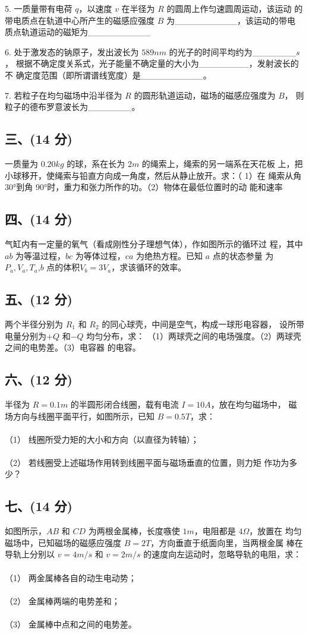 5. 一质量带有电荷 $q$，以速度 $v$ 在半径为 $R$ 的圆周上作匀速圆周运动，该运动
的带电质点在轨道中心所产生的磁感应强度 $B$ 为__________，该运动的带电
质点轨道运动的磁矩为__________

6. 处于激发态的钠原子，发出波长为 $589nm$ 的光子的时间平均约为_______$s$，
根据不确定度关系式，光子能量不确定量的大小为________，发射波长的不
确定度范围（即所谓谱线宽度）是__________。

7. 若粒子在均匀磁场中沿半径为 $R$ 的圆形轨道运动，磁场的磁感应强度为 $B$，
则粒子的德布罗意波长为_______。
\subsection{三、(14 分)}
一质量为 $0.20kg$ 的球，系在长为 $2m$ 的绳索上，绳索的另一端系在天花板
上，把小球移开，使绳索与铅直方向成一角度，然后从静止放开。求：（ 1）在
绳索从角 30°到角 90°时，重力和张力所作的功。（2）物体在最低位置时的动
能和速率
\subsection{四、(14 分)}
气缸内有一定量的氧气（看成刚性分子理想气体），作如图所示的循环过
程，其中 $ab$ 为等温过程，$bc$ 为等体过程，$ca$ 为绝热方程。已知 $a$ 点的状态参量
为$P_a,V_a,T_a$,$b$ 点的体积$V_b=3V_a$，求该循环的效率。
\subsection{五、(12 分)}
两个半径分别为 $R_1$ 和 $R_2$ 的同心球壳，中间是空气，构成一球形电容器，
设所带电量分别为$+Q$ 和$-Q$ 均匀分布，求：
（1）两球壳之间的电场强度。（2）两球壳之间的电势差。（3）电容器
的电容。
\subsection{六、(12 分)}
半径为 $R=0.1m$ 的半圆形闭合线圈，载有电流 $I=10A$，放在均匀磁场中，
磁场方向与线圈平面平行，如图所示，已知 $B=0.5T$，求：\\\\
（1） 线圈所受力矩的大小和方向（以直径为转轴）；\\\\
（2） 若线圈受上述磁场作用转到线圈平面与磁场垂直的位置，则力矩
作功为多少？
\subsection{七、(14 分)}
如图所示，$AB$ 和 $CD$ 为两根金属棒，长度嗾使 $1m$，电阻都是 $4\Omega$，放置在
均匀磁场中，已知磁场的磁感应强度 $B=2T$，方向垂直于纸面向里，当两根金属
棒在导轨上分别以 $v=4m/s$ 和 $v=2m/s$ 的速度向左运动时，忽略导轨的电阻，求：\\\\
（1） 两金属棒各自的动生电动势；\\\\
（2） 金属棒两端的电势差和；\\\\
（3） 金属棒中点和之间的电势差。\\\\
